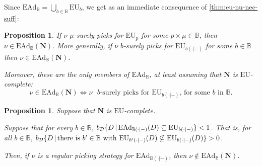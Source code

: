\documentclass[a4paper]{article}
\newtheorem{proposition}[theorem]{Proposition}
\newcommand\D{\mathcal{D}}
\newcommand\N{\mathbf{N}}
\renewcommand\P{\mathbb{P}} %
\renewcommand\c{\mathsf{c}} %
\newcommand\EU{\mathrm{EU}}
\newcommand\EAd{\mathrm{EAd}}
\newcommand{\IB}{\mathbb{B}}
\newcommand{\IP}{\P}
\newcommand{\pb}{b}
\newcommand{\todoinfo}[2][]{\todo[backgroundcolor=orange!80,bordercolor=black,linecolor=gray!80, #1,inline,caption={}]{#2}}
\renewcommand{\color}[1]{}
\newcommand\SetDelimiter[1][]{
	\nonscript\,#1\vert \allowbreak \nonscript\,\mathopen{}}
\providecommand\given{\SetDelimiter}
\newenvironment{CCM rewritten}
{\begingroup\color{blue}} %
{\endgroup}              %
\begin{document}

Since $\EAd_\IB=\bigcup_{\pb\in\IB}\EU_\pb$, we get as an immediate consequence of \cref{thm:eu-nu-nec-suff}:
\begin{proposition}\label{thm:ead-nu-nec-suff}
If $\nu$ $\mu$-surely picks for $\EU_p$ for some $p\times \mu\in \IB$, then $\nu\in\EAd_\IB(\N)$. More generally, if $\nu$ $\pb$-surely picks for $\EU_{\pb(\cdot|-)}$ for some $\pb\in\IB$ then $\nu\in\EAd_\IB(\N)$. 

Moreover, these are the only members of $\EAd_\IB$, at least assuming that $\N$ is $\EU$-complete: 
$$\nu \in \EAd_\IB(\N) \Leftrightarrow \nu \text{ $\pb$-surely picks for $\EU_{\pb(\cdot|-)}$, for some $\pb$ in $\IB$.}$$

\end{proposition}


	\begin{proposition}\label{thm:ead-nu-reg-nec}
		Suppose that $\N$ is $\EU$-complete. 
		
Suppose that for every $\pb\in\IB$, $\pb_\D\{D\given \EAd_{\IB(\cdot|-)}(D)\subseteq\EU_{\pb(\cdot|-)}\}<1$. That is, for all $\pb\in \IB$, $\pb_\D\{D\given \text{there is $\pb'\in\IB$ with }\EU_{\pb'(\cdot|-)}(D)\not\subseteq\EU_{\pb(\cdot|-)}(D)\}>0$. 
		
		
	Then, if $\nu$ is a regular picking strategy for $\EAd_{\IB(\cdot|-)}$, then $\nu\notin \EAd_\IB(\N)$.
	\end{proposition}
	
\end{document}
